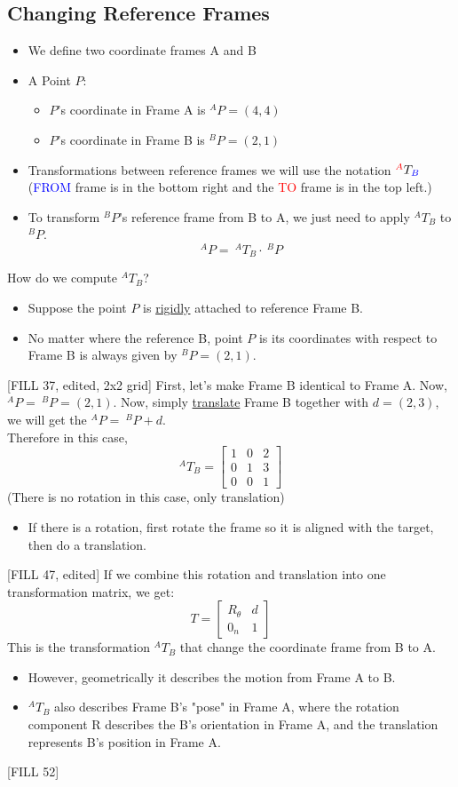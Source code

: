\documentclass[10pt]{article}
\begin{document}
\subsection*{Changing Reference Frames}
\begin{itemize}
	\item We define two coordinate frames A and B
	\item A Point $P$:
	\begin{itemize}
        \item $P$'s coordinate in Frame A is $^A P = (4, 4)$
        \item $P$'s coordinate in Frame B is $^B P = (2, 1)$
    \end{itemize}
    \item Transformations between reference frames we will use the notation $^{\textcolor{red}{A}} T_{\textcolor{blue}{B}}$ (\textcolor{blue}{FROM} frame is in the bottom right and the \textcolor{red}{TO} frame is in the top left.)
    \item To transform $^B P$'s reference frame from B to A, we just need to apply $^A T_B$ to $^B P$.
    \[^A P = \:^A T_B \cdot \:^B P\]
\end{itemize}
How do we compute $^A T_B$?
\begin{itemize}
	\item Suppose the point $P$ is \underline{rigidly} attached to reference Frame B.
	\item No matter where the reference B, point $P$ is its coordinates with respect to Frame B is always given by $^B P = (2, 1)$.
\end{itemize}
[FILL 37, edited, 2x2 grid]
First, let's make Frame B identical to Frame A.  Now, $^A P = \:^B P = (2, 1)$.  Now, simply \underline{translate} Frame B together with $d = (2, 3)$, we will get the $^A P = \:^B P + d$.\\
Therefore in this case,
\[^A T_B = \begin{bmatrix} 1 & 0 & 2 \\ 0 & 1 & 3 \\ 0 & 0 & 1 \end{bmatrix}\]
(There is no rotation in this case, only translation)
\begin{itemize}
	\item If there is a rotation, first rotate the frame so it is aligned with the target, then do a translation.
\end{itemize}
[FILL 47, edited]
If we combine this rotation and translation into one transformation matrix, we get:
\[T = \begin{bmatrix} R_\theta & d \\ 0_n & 1 \end{bmatrix}\]
This is the transformation $^A T_B$ that change the coordinate frame from B to A.
\begin{itemize}
	\item However, geometrically it describes the motion from Frame A to B.
	\item $^A T_B$ also describes Frame B's "pose" in Frame A, where the rotation component R describes the B's orientation in Frame A, and the translation represents B's position in Frame A.
\end{itemize}
[FILL 52]
\end{document}

